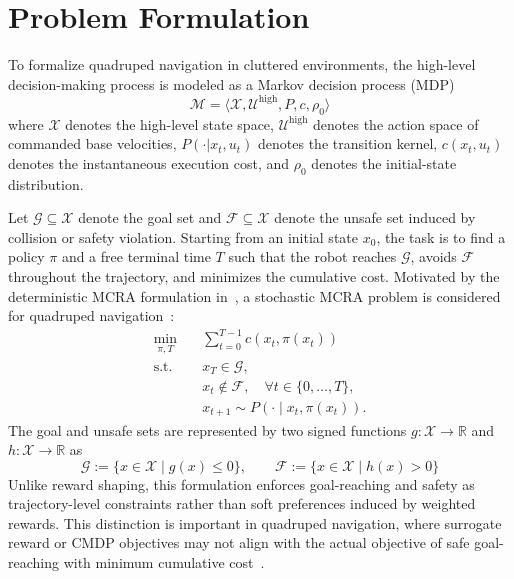 \documentclass{article}
\begin{document}
\section{Problem Formulation}
To formalize quadruped navigation in cluttered environments, the high-level decision-making process is modeled as a Markov decision process (MDP)
\begin{equation}
\mathcal{M}=\langle \mathcal{X}, \mathcal{U}^{\mathrm{high}}, P, c, \rho_0 \rangle
\end{equation}
where $\mathcal{X}$ denotes the high-level state space, $\mathcal{U}^{\mathrm{high}}$ denotes the action space of commanded base velocities, $P(\cdot|x_t,u_t)$ denotes the transition kernel, $c(x_t,u_t)$ denotes the instantaneous execution cost, and $\rho_0$ denotes the initial-state distribution.

Let $\mathcal{G}\subseteq\mathcal{X}$ denote the goal set and $\mathcal{F}\subseteq\mathcal{X}$ denote the unsafe set induced by collision or safety violation. Starting from an initial state $x_0$, the task is to find a policy $\pi$ and a free terminal time $T$ such that the robot reaches $\mathcal{G}$, avoids $\mathcal{F}$ throughout the trajectory, and minimizes the cumulative cost. Motivated by the deterministic MCRA formulation in~\citep{so2024}, a stochastic MCRA problem is considered for quadruped navigation~\citep{bansal2017}:
\begin{align}
\min_{\pi,T}\quad & \sum_{t=0}^{T-1} c\!\left(x_t,\pi(x_t)\right) \label{eq:mcra_obj}\\
\mathrm{s.t.}\quad & x_T \in \mathcal{G}, \label{eq:mcra_goal}\\
& x_t \notin \mathcal{F},\quad \forall t\in\{0,\dots,T\}, \label{eq:mcra_safe}\\
& x_{t+1}\sim P\!\left(\cdot\mid x_t,\pi(x_t)\right). \label{eq:mcra_dyn}
\end{align}
The goal and unsafe sets are represented by two signed functions
$g:\mathcal{X}\rightarrow\mathbb{R}$ and $h:\mathcal{X}\rightarrow\mathbb{R}$ as
\begin{equation}
\mathcal{G} := \{x\in\mathcal{X}\mid g(x)\le 0\}, \qquad
\mathcal{F} := \{x\in\mathcal{X}\mid h(x)>0\}
\end{equation}
Unlike reward shaping, this formulation enforces goal-reaching and safety as trajectory-level constraints rather than soft preferences induced by weighted rewards. This distinction is important in quadruped navigation, where surrogate reward or CMDP objectives may not align with the actual objective of safe goal-reaching with minimum cumulative cost~\citep{so2024}.
\end{document}
